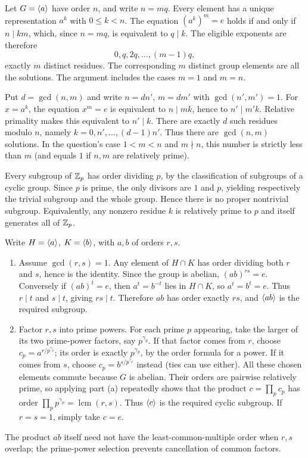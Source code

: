 Let $G=\langle a\rangle$ have order $n$, and write $n=mq$. Every element has a unique representation $a^k$ with $0\le k<n$. The equation $(a^k)^m=e$ holds if and only if $n\mid km$, which, since $n=mq$, is equivalent to $q\mid k$. The eligible exponents are therefore
\[0,q,2q,\ldots,(m-1)q,\]
exactly $m$ distinct residues. The corresponding $m$ distinct group elements are all the solutions. The argument includes the cases $m=1$ and $m=n$.

Put $d=\gcd(n,m)$ and write $n=dn'$, $m=dm'$ with $\gcd(n',m')=1$. For $x=a^k$, the equation $x^m=e$ is equivalent to $n\mid mk$, hence to $n'\mid m'k$. Relative primality makes this equivalent to $n'\mid k$. There are exactly $d$ such residues modulo $n$, namely $k=0,n',\ldots,(d-1)n'$. Thus there are $\gcd(n,m)$ solutions. In the question's case $1<m<n$ and $m\nmid n$, this number is strictly less than $m$ (and equals $1$ if $n,m$ are relatively prime).

Every subgroup of $\mathbb{Z}_p$ has order dividing $p$, by the classification of subgroups of a cyclic group. Since $p$ is prime, the only divisors are $1$ and $p$, yielding respectively the trivial subgroup and the whole group. Hence there is no proper nontrivial subgroup. Equivalently, any nonzero residue $k$ is relatively prime to $p$ and itself generates all of $\mathbb{Z}_p$.

Write $H=\langle a\rangle$, $K=\langle b\rangle$, with $a,b$ of orders $r,s$.
\begin{enumerate}[label=(\alph*)]
\item Assume $\gcd(r,s)=1$. Any element of $H\cap K$ has order dividing both $r$ and $s$, hence is the identity. Since the group is abelian, $(ab)^{rs}=e$. Conversely if $(ab)^t=e$, then $a^t=b^{-t}$ lies in $H\cap K$, so $a^t=b^t=e$. Thus $r\mid t$ and $s\mid t$, giving $rs\mid t$. Therefore $ab$ has order exactly $rs$, and $\langle ab\rangle$ is the required subgroup.
\item Factor $r,s$ into prime powers. For each prime $p$ appearing, take the larger of its two prime-power factors, say $p^{\gamma_p}$. If that factor comes from $r$, choose $c_p=a^{r/p^{\gamma_p}}$; its order is exactly $p^{\gamma_p}$, by the order formula for a power. If it comes from $s$, choose $c_p=b^{s/p^{\gamma_p}}$ instead (ties can use either). All these chosen elements commute because $G$ is abelian. Their orders are pairwise relatively prime, so applying part (a) repeatedly shows that the product $c=\prod_p c_p$ has order $\prod_p p^{\gamma_p}=\operatorname{lcm}(r,s)$. Thus $\langle c\rangle$ is the required cyclic subgroup. If $r=s=1$, simply take $c=e$.
\end{enumerate}
The product $ab$ itself need not have the least-common-multiple order when $r,s$ overlap; the prime-power selection prevents cancellation of common factors.

